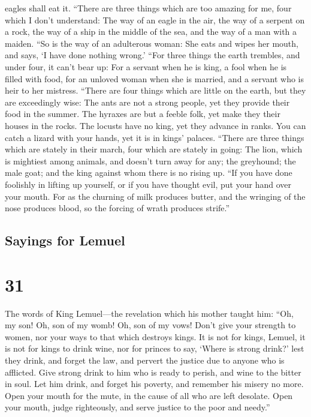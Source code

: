 eagles shall eat it.  ``There are three things which are
too amazing for me, four which I don't understand:  The
way of an eagle in the air, the way of a serpent on a rock, the way of a
ship in the middle of the sea, and the way of a man with a maiden.
 ``So is the way of an adulterous woman: She eats and
wipes her mouth, and says, `I have done nothing wrong.' 
``For three things the earth trembles, and under four, it can't bear up:
 For a servant when he is king, a fool when he is filled
with food,  for an unloved woman when she is married, and
a servant who is heir to her mistress.  ``There are four
things which are little on the earth, but they are exceedingly wise:
 The ants are not a strong people, yet they provide their
food in the summer.  The hyraxes are but a feeble folk,
yet make they their houses in the rocks.  The locusts
have no king, yet they advance in ranks.  You can catch a
lizard with your hands, yet it is in kings' palaces. 
``There are three things which are stately in their march, four which
are stately in going:  The lion, which is mightiest among
animals, and doesn't turn away for any;  the greyhound;
the male goat; and the king against whom there is no rising up.
 ``If you have done foolishly in lifting up yourself, or
if you have thought evil, put your hand over your mouth. 
For as the churning of milk produces butter, and the wringing of the
nose produces blood, so the forcing of wrath produces strife.''

\hypertarget{sayings-for-lemuel}{%
\subsection{Sayings for Lemuel}\label{sayings-for-lemuel}}

\hypertarget{section-30}{%
\section{31}\label{section-30}}

 The words of King Lemuel---the revelation which his
mother taught him:  ``Oh, my son! Oh, son of my womb! Oh,
son of my vows!  Don't give your strength to women, nor
your ways to that which destroys kings.  It is not for
kings, Lemuel, it is not for kings to drink wine, nor for princes to
say, `Where is strong drink?'  lest they drink, and forget
the law, and pervert the justice due to anyone who is afflicted.
 Give strong drink to him who is ready to perish, and wine
to the bitter in soul.  Let him drink, and forget his
poverty, and remember his misery no more.  Open your mouth
for the mute, in the cause of all who are left desolate. 
Open your mouth, judge righteously, and serve justice to the poor and
needy.''

